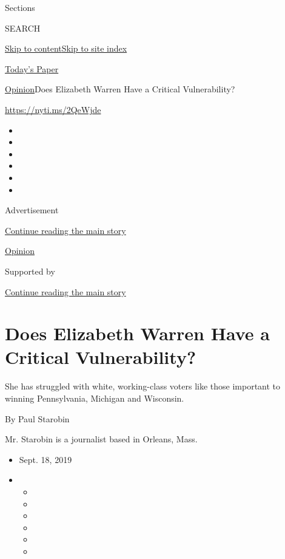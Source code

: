 Sections

SEARCH

\protect\hyperlink{site-content}{Skip to
content}\protect\hyperlink{site-index}{Skip to site index}

\href{https://myaccount.nytimes.com/auth/login?response_type=cookie\&client_id=vi}{}

\href{https://www.nytimes.com/section/todayspaper}{Today's Paper}

\href{/section/opinion}{Opinion}\textbar{}Does Elizabeth Warren Have a
Critical Vulnerability?

\href{https://nyti.ms/2QeWjde}{https://nyti.ms/2QeWjde}

\begin{itemize}
\item
\item
\item
\item
\item
\item
\end{itemize}

Advertisement

\protect\hyperlink{after-top}{Continue reading the main story}

\href{/section/opinion}{Opinion}

Supported by

\protect\hyperlink{after-sponsor}{Continue reading the main story}

\hypertarget{does-elizabeth-warren-have-a-critical-vulnerability}{%
\section{Does Elizabeth Warren Have a Critical
Vulnerability?}\label{does-elizabeth-warren-have-a-critical-vulnerability}}

She has struggled with white, working-class voters like those important
to winning Pennsylvania, Michigan and Wisconsin.

By Paul Starobin

Mr. Starobin is a journalist based in Orleans, Mass.

\begin{itemize}
\item
  Sept. 18, 2019
\item
  \begin{itemize}
  \item
  \item
  \item
  \item
  \item
  \item
  \end{itemize}
\end{itemize}

